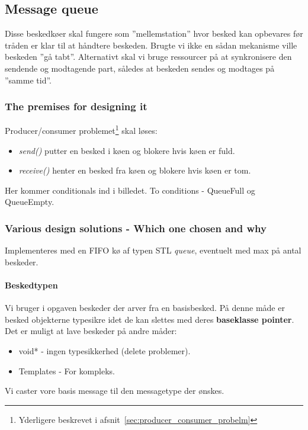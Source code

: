 \subsection{Message queue}
Disse beskedkøer skal fungere som ''mellemstation'' hvor besked kan opbevares før tråden er klar til at håndtere beskeden. Brugte vi ikke en sådan mekanisme ville beskeden ''gå tabt''. Alternativt skal vi bruge ressourcer på at synkronisere den sendende og modtagende part, således at beskeden sendes og modtages på ''samme tid''.

\subsubsection{The premises for designing it}
Producer/consumer problemet\footnote{Yderligere beskrevet i afsnit~\ref{sec:producer_consumer_probelm}} skal løses:
\begin{itemize}
	\item \textit{send()}
	putter en besked i køen og blokere hvis køen er fuld.
	
	\item \textit{receive()}
	henter en besked fra køen og blokere hvis køen er tom.
\end{itemize}
Her kommer conditionals ind i billedet. To conditions - QueueFull og QueueEmpty.

\subsubsection{Various design solutions - Which one chosen and why}
Implementeres med en FIFO kø af typen STL \textit{queue}, eventuelt med max på antal beskeder.

\paragraph{Beskedtypen}

Vi bruger i opgaven beskeder der arver fra en basisbesked. På denne måde er besked objekterne typesikre idet de kan slettes med deres \textbf{baseklasse pointer}.
Det er muligt at lave beskeder på andre måder:

\begin{itemize}
	\item void* - ingen typesikkerhed (delete problemer).
	
	\item Templates - For kompleks.
\end{itemize}

Vi caster vore basis message til den messagetype der ønskes.

